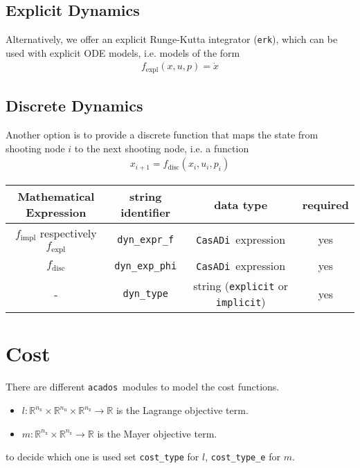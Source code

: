 \documentclass{article}
\newcommand{\code}[1]{\texttt{#1}}
\newcommand{\casadi}{\texttt{CasADi}}
\newcommand{\acados}{\texttt{acados}}
\newcommand{\ind}[1]{_{\textrm{#1}}}
\newcommand{\nx}{n\ind{x}}
\newcommand{\nuu}{n\ind{u}}
\newcommand{\nz}{n\ind{z}}
\begin{document}
\subsection*{Explicit Dynamics}
Alternatively, we offer an explicit Runge-Kutta integrator (\code{erk}), which can be used with explicit ODE models, i.e. models of the form
\begin{align*}
f\ind{expl}(x,u,p) = \dot{x}
\end{align*}

\subsection*{Discrete Dynamics}
Another option is to provide a discrete function that maps the state from shooting node $ i $ to the next shooting node, i.e. a function
\begin{align*}
x_{i+1} = f\ind{disc}(x_i,u_i,p_i)
\end{align*}


\newcommand{\mandatory}{yes}
\newcommand{\optional}{no}
\begin{table}[h!]
	\centering
	\begin{tabular}{|c|c|c|c|}
		\toprule
		Mathematical Expression & string identifier & data type & required \\ \midrule
		$ f\ind{impl} $ respectively $ f\ind{expl} $ & \code{dyn\_expr\_f}    & \casadi~expression & \mandatory \\ \midrule
		$f\ind{disc}$ & \code{dyn\_exp\_phi} & \casadi~expression & \mandatory \\ \midrule
		- & \code{dyn\_type}    & string (\code{explicit} or \code{implicit}) & \mandatory \\
		\bottomrule
	\end{tabular}
\end{table}

\newpage
\section{Cost}
There are different \acados~modules to model the cost functions.
\begin{itemize}
\item $ l: \mathbb{R}^{\nx}\times\mathbb{R}^{\nuu}\times\mathbb{R}^{\nz} \rightarrow \mathbb{R}$ is the Lagrange objective term.
\item $ m: \mathbb{R}^{\nx}\times\mathbb{R}^{\nz} \rightarrow \mathbb{R} $ is the Mayer objective term.
\end{itemize}
to decide which one is used set \code{cost\_type} for $ l $, \code{cost\_type\_e} for $ m $.
\end{document}
